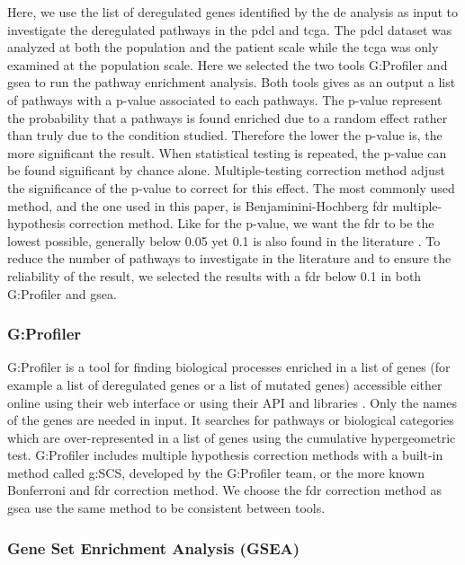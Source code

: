 Here, we use the list of deregulated genes identified by the \acrlong{de} analysis as input to investigate the deregulated pathways in the \acrshort{pdcl} and \acrshort{tcga}.
The \acrlong{pdcl} dataset was analyzed at both the population and the patient scale while the \acrshort{tcga} was only examined at the population scale.
Here we selected the two tools G:Profiler and \acrfull{gsea} to run the pathway enrichment analysis.
Both tools gives as an output a list of pathways with a p-value associated to each pathways.
The p-value represent the probability that a pathways is found enriched due to a random effect rather than truly due to the condition studied.
Therefore the lower the p-value is, the more significant the result.
When statistical testing is repeated, the p-value can be found significant by chance alone.
Multiple-testing correction method adjust the significance of the p-value to correct for this effect.
The most commonly used method, and the one used in this paper, is Benjaminini-Hochberg \acrfull{fdr} multiple-hypothesis correction method.
Like for the p-value, we want the \acrshort{fdr} to be the lowest possible, generally below 0.05 yet 0.1 is also found in the literature \cite*{Reimand2019}.
To reduce the number of pathways to investigate in the literature and to ensure the reliability of the result, we selected the results with a \acrshort{fdr} below 0.1 in both G:Profiler and \acrshort{gsea}.

\subsubsection{G:Profiler}
G:Profiler is a tool for finding biological processes enriched in a list of genes (for example a list of deregulated genes or a list of mutated genes) accessible either online using their web interface or using their API and libraries \cite*{Raudvere2019}.
Only the names of the genes are needed in input.
It searches for pathways or biological categories which are over-represented in a list of genes using the cumulative hypergeometric test.
G:Profiler includes multiple hypothesis correction methods with a built-in method called g:SCS, developed by the G:Profiler team, or the more known Bonferroni and \acrshort{fdr} correction method.
We choose the \acrshort{fdr} correction method as \acrshort{gsea} use the same method to be consistent between tools.

\subsubsection{Gene Set Enrichment Analysis (GSEA)}

